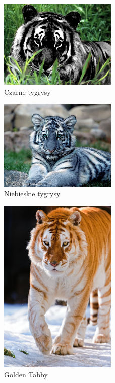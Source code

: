 \documentclass{beamer}
\begin{document}
\begin{frame}
 \begin{figure}
\caption{Czarne tygrysy}
\centering
\includegraphics[width=0.5\textwidth]{Black_Tiger.jpg}
\end{figure}
\end{frame}

\begin{frame}
 \begin{figure}
\caption{Niebieskie tygrysy}
\centering
\includegraphics[width=0.5\textwidth]{niebieski_tygrys.jpg}
\end{figure}
\end{frame}

\begin{frame}
 \begin{figure}
\caption{Golden Tabby}
\centering
\includegraphics[width=0.5\textwidth]{cJUlOim.jpg}
\end{figure}
\end{frame}

 
 
\end{document}
